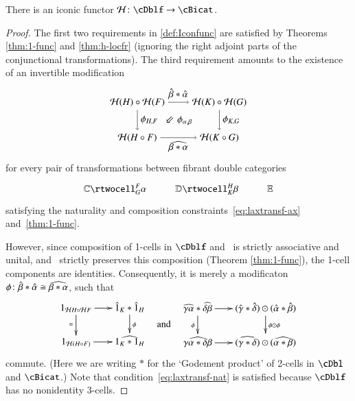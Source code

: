 \begin{thm}\label{thm:h-functor}
  There is an iconic functor $\cH\maps \cDblf\to \cBicat$.
\end{thm}
\begin{proof}
The first two requirements in \autoref{def:Iconfunc} are satisfied by Theorems \ref{thm:1-func} and \ref{thm:h-locfr} (ignoring the right adjoint parts of the conjunctional transformations).
The third requirement amounts to the existence of an invertible modification
%
\begin{equation}
\begin{tikzpicture}[xscale=0.75, yscale=1.3]
\node (tl) at (0,2) {${\cH}(H) \circ {\cH}(F)$};
\node (bl) at (0,1) {${\cH}(H \circ F)$};
\node (tr) at (4,2) {${\cH}(K) \circ {\cH}(G)$};
\node (br) at (4,1) {${\cH}(K \circ G)$};
\draw[->] (tl) to node [above] {$\hat{\beta} * \hat{\alpha}$} (tr);
\draw[->] (tr) to node [right] {$\phi_{K,G}$} (br);
\draw[->] (tl) to node [right] {$\phi_{H,F}$} (bl);
\draw[->] (bl) to node [below] {$\widehat{\be*\al}$} (br);
\node at (2,1.5) {$\Arrow{5} \phi_{\alpha,\beta} $};
\end{tikzpicture}
\end{equation}
%
for every pair of transformations between fibrant double categories
  \[\vcenter{\xymatrix{\lC \rtwocell^F_G{\al} & \lD \rtwocell^H_K{\be}
      & \lE}}\]
satisfying the naturality and composition constraints~\ref{eq:laxtransf-ax} and~\ref{thm:1-func}.

However, since composition of
  1-cells in $\cDblf$ and \cBicat\ is strictly associative and
  unital, and \cH\ strictly preserves this composition (Theorem \ref{thm:1-func}),
  the 1-cell components are identities. Consequently, it is merely  a modificaton $\phi\colon \hat{\beta} * \hat{\alpha} \cong \widehat{\beta*\alpha}$, such that 
%
 \begin{equation}
        \vcenter{\xymatrix@-.5pc{
        1_{{\cH}H \circ {\cH}F} \ar[r]\ar[d]_{=} &
        \hat{1}_{K}*\hat{1}_{H}\ar[d]^{\phi}\\
        1_{{\cH}(H \circ F)}\ar[r] &
        \widehat{1_{K} *1_{H}}}} \quad\text{and}\quad       
    \vcenter{\xymatrix@-.5pc{
        \widehat{\gm\al}*\widehat{\de\be} \ar[r]\ar[d]_\phi &
        (\gmhat*\dehat)\odot(\alhat*\behat)\ar[d]^{\phi \odot \phi}\\
        \widehat{\gm\al*\de\be}\ar[r] &
        (\widehat{\gm*\de})\odot(\widehat{\al*\be})}}
  \end{equation}
commute. (Here we are writing $*$ for the `Godement product' of 2-cells in $\cDbl$ and $\cBicat$.)    
Note that condition~\ref{eq:laxtransf-nat} is satisfied because $\cDblf$ has no nonidentity 3-cells.
  

\end{proof}
